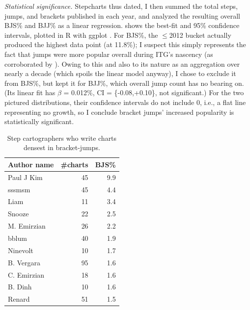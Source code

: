 \documentclass[10pt]{sigplanconf}
\begin{document}
\textit{Statistical significance.}
Stepcharts thus dated, I then summed the total steps, jumps, and brackets published in each year,
and analyzed the resulting overall BJS\% and BJJ\% as a linear regression.
 shows the best-fit and 95\% confidence intervals,
plotted in R \cite{r-lang} with ggplot \cite{ggplot}.
For BJS\%, the $\le$2012 bucket actually produced the highest data point (at 11.8\%);
I suspect this simply represents the fact that jumps were more popular overall during ITG's nascency
(as corroborated by ).
Owing to this and also to its nature as an aggregation over nearly a decade (which spoils the linear model anyway),
I chose to exclude it from BJS\%,
but kept it for BJJ\%, which overall jump count has no bearing on.
(Its linear fit has $\beta$ = 0.012\%, CI = \{-0.08,+0.10\}, not significant.)
For the two pictured distributions, their confidence intervals do not include 0,
i.e., a flat line representing no growth,
so I conclude bracket jumps' increased popularity is statistically significant.

\begin{table}[t]
	\begin{center}
		\small
	\begin{tabular}{l|r|r}
		\bf Author name & \bf \#charts & \bf BJS\% \\
		\hline
		Paul J Kim & 45 & 9.9 \\
		sssmsm & 45 & 4.4 \\
		Liam & 11 & 3.4 \\
		Snooze & 22 & 2.5 \\
		M. Emirzian & 26 & 2.2 \\
		bblum & 40 & 1.9 \\
		Ninevolt & 10 & 1.7 \\
		B. Vergara & 95 & 1.6 \\
		C. Emirzian & 18 & 1.6 \\
		B. Dinh & 10 & 1.6 \\
		Renard & 51 & 1.5 \\
	\end{tabular}
	\end{center}
	\caption{Step cartographers who write charts densest in bracket-jumps.}
	\label{tab:author-bjs}
\end{table}
\end{document}
